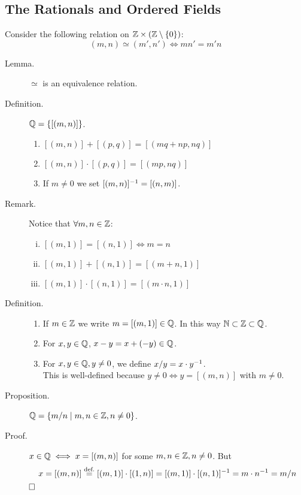 \documentclass[letterpaper,11pt]{article}
\begin{document}
\subsection{The Rationals and Ordered Fields}
Consider the following relation on $\mathbb{Z}\times(\mathbb{Z}\setminus\{0\})$:
\[
(m,n)\simeq(m',n')\iff mn' = m'n
\]
\begin{description}
\item[Lemma.] $\simeq$ is an equivalence relation.
\item[Definition.] $\mathbb{Q} = \{[(m,n)]\}$.
  \begin{enumerate}[1)]
  \item $[(m,n)]+[(p,q)]=[(mq+np,nq)]$
  \item $[(m,n)]\cdot[(p,q)]=[(mp,nq)]$
  \item If $m\ne0$ we set ${[(m,n)]^{-1}} = [(n,m)]$.
  \end{enumerate}


\item[Remark.] Notice that $\forall m,n\in\mathbb{Z}$:
  \begin{enumerate}[i)]
  \item $[(m,1)]=[(n,1)] \iff m=n$
  \item $[(m,1)]+[(n,1)] = [(m+n,1)]$
  \item $[(m,1)]\cdot[(n,1)]=[(m\cdot n, 1)]$
  \end{enumerate}

\item[Definition.]\mbox{}
  \begin{enumerate}[1)]
  \item If $m\in\mathbb{Z}$ we write $m=[(m,1)]\in\mathbb{Q}$.
      In this way $\mathbb{N}\subset\mathbb{Z}\subset\mathbb{Q}$.
  \item For $x,y\in\mathbb{Q}$, $x-y=x+(-y)\in\mathbb{Q}$.
  \item For $x,y\in\mathbb{Q}, y\ne0$, we define $x/y=x\cdot{y^{-1}}$.\\
      This is well-defined because $y\ne0\iff y=[(m,n)]$ with $m\ne0$.
  \end{enumerate}


\item[Proposition.] $\mathbb{Q}=\{m/n\;|\;m,n\in\mathbb{Z},n\ne0\}$.
\item[Proof.] $x\in\mathbb{Q}\iff x = [(m,n)]$ for some $m,n\in\mathbb{Z},n\ne0$.
    But \[
    x=[(m,n)]\stackrel{\text{def.}}{=}[(m,1)]\cdot[(1,n)]=
    [(m,1)]\cdot{[(n,1)]^{-1}}=m\cdot{n^{-1}}=m/n
    \] $\hfill\square$
    \vspace{-0.3in}



\end{description}
\end{document}
